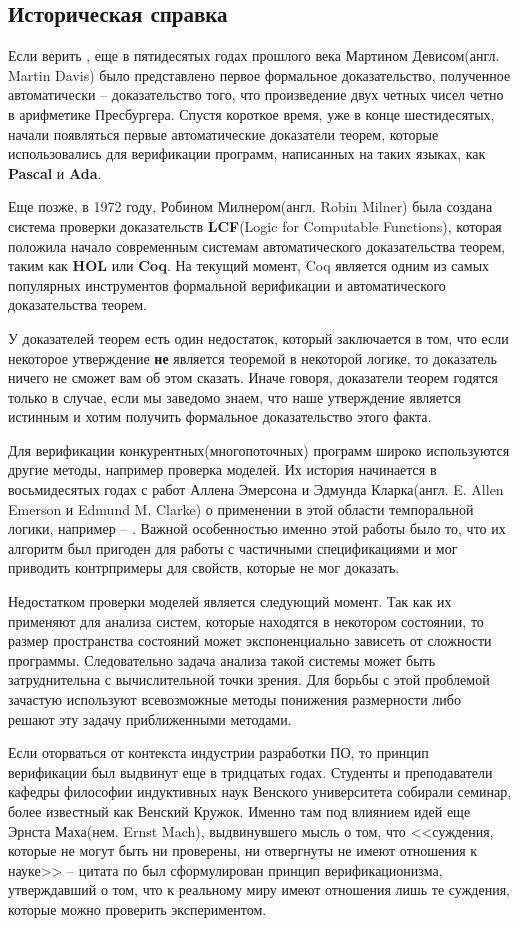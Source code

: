 \subsection{Историческая справка}

Если верить \cite{omodeo2017martin}, еще в пятидесятых годах прошлого века Мартином Девисом(англ. Martin Davis) было представлено первое формальное доказательство, полученное автоматически -- доказательство того, что произведение двух четных чисел четно в арифметике Пресбургера. Спустя короткое время, уже в конце шестидесятых, начали появляться первые автоматические доказатели теорем, которые использовались для верификации программ, написанных на таких языках, как \textbf{Pascal} и \textbf{Ada}.

Еще позже, в 1972 году, Робином Милнером(англ. Robin Milner) была создана система проверки доказательств \textbf{LCF}(Logic for Computable Functions), которая положила начало современным системам автоматического доказательства теорем, таким как \textbf{HOL} или \textbf{Coq}. На текущий момент, Coq является одним из самых популярных инструментов формальной верификации и автоматического доказательства теорем.

У доказателей теорем есть один недостаток, который заключается в том, что если некоторое утверждение \textbf{не} является теоремой в некоторой логике, то доказатель ничего не сможет вам об этом сказать. Иначе говоря, доказатели теорем годятся только в случае, если мы заведомо знаем, что наше утверждение является истинным и хотим получить формальное доказательство этого факта.

Для верификации конкурентных(многопоточных) программ широко используются другие методы, например проверка моделей. Их история начинается в восьмидесятых годах с работ Аллена Эмерсона и Эдмунда Кларка(англ. E. Allen Emerson и Edmund M. Clarke) о применении в этой области темпоральной логики, например -- \cite{Clarke:1981:DSS:648063.747438}. Важной особенностью именно этой работы было то, что их алгоритм был пригоден для работы с частичными спецификациями и мог приводить контрпримеры для свойств, которые не мог доказать.

Недостатком проверки моделей является следующий момент. Так как их применяют для анализа систем, которые находятся в некотором состоянии, то размер пространства состояний может экспоненциально зависеть от сложности программы. Следовательно задача анализа такой системы может быть затруднительна с вычислительной точки зрения. Для борьбы с этой проблемой зачастую используют всевозможные методы понижения размерности либо решают эту задачу приближенными методами.

Если оторваться от контекста индустрии разработки ПО, то принцип верификации был выдвинут еще в тридцатых годах. Студенты и преподаватели кафедры философии индуктивных наук Венского университета собирали семинар, более известный как Венский Кружок. Именно там под влиянием идей еще Эрнста Маха(нем. Ernst Mach), выдвинувшего мысль о том, что <<суждения, которые не могут быть ни проверены, ни отвергнуты не имеют отношения к науке>> -- цитата по \cite{wiki:mach} был сформулирован принцип верификационизма, утверждавший о том, что к реальному миру имеют отношения лишь те суждения, которые можно проверить экспериментом.
